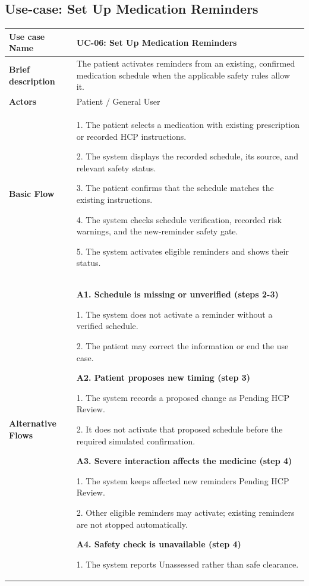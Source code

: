 \subsection{Use-case: Set Up Medication Reminders}
\label{uc:uc-06}
\begin{longtable}{|p{}|p{}|}
\hline
\textbf{Use case Name} & UC-06: Set Up Medication Reminders \\ \hline
\textbf{Brief description} & The patient activates reminders from an existing, confirmed medication schedule when the applicable safety rules allow it. \\ \hline
\textbf{Actors} & Patient / General User \\ \hline
\textbf{Basic Flow} &
1. The patient selects a medication with existing prescription or recorded HCP instructions.\par
2. The system displays the recorded schedule, its source, and relevant safety status.\par
3. The patient confirms that the schedule matches the existing instructions.\par
4. The system checks schedule verification, recorded risk warnings, and the new-reminder safety gate.\par
5. The system activates eligible reminders and shows their status.
\\ \hline
\textbf{Alternative Flows} &
\textbf{A1. Schedule is missing or unverified (steps 2-3)}\par
1. The system does not activate a reminder without a verified schedule.\par
2. The patient may correct the information or end the use case.
\par\smallskip
\textbf{A2. Patient proposes new timing (step 3)}\par
1. The system records a proposed change as Pending HCP Review.\par
2. It does not activate that proposed schedule before the required simulated confirmation.
\par\smallskip
\textbf{A3. Severe interaction affects the medicine (step 4)}\par
1. The system keeps affected new reminders Pending HCP Review.\par
2. Other eligible reminders may activate; existing reminders are not stopped automatically.
\par\smallskip
\textbf{A4. Safety check is unavailable (step 4)}\par
1. The system reports Unassessed rather than safe clearance.\par

\end{longtable}
